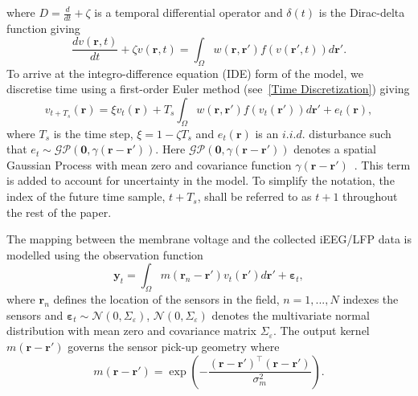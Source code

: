 \documentclass[10pt,a4paper]{article}
\begin{document}
where $D=\frac{d}{dt} + \zeta$ is a temporal differential operator and $\delta(t)$ is the Dirac-delta function giving 
\begin{equation}
	\label{FinalFormContinuous} 
	\frac{dv\left( \mathbf{r},t \right)}{dt} + \zeta v\left( \mathbf{r},t \right) = \int_\Omega {w\left( \mathbf{r},\mathbf{r}' \right)f\left( {v\left( \mathbf{r}',t \right)} \right)d\mathbf{r}'}. 
\end{equation}
To arrive at the integro-difference equation (IDE) form of the model, we discretise time using a first-order Euler method (see~\ref{Time Discretization}) giving 
\begin{equation}
	\label{DiscreteTimeModel} 
	v_{t+T_s}\left(\mathbf{r}\right) = 
	\xi v_t\left(\mathbf{r}\right) + 
	T_s \int_\Omega { 
	    w\left(\mathbf{r},\mathbf{r}'\right)
	    f\left(v_t\left(\mathbf{r}'\right)\right) 
	d\mathbf{r}'} 
	+ e_t\left(\mathbf{r}\right), 
\end{equation}
where $T_s$ is the time step, $\xi = 1-\zeta T_s$ and $e_t(\mathbf{r})$ is an $i.i.d.$ disturbance such that $e_t\sim\mathcal{GP}(\mathbf 0,\gamma(\mathbf{r}-\mathbf{r}'))$. Here $\mathcal{GP}(\mathbf 0,\gamma(\mathbf{r}-\mathbf{r}'))$ denotes a spatial Gaussian Process with mean zero and covariance function $\gamma(\mathbf{r}-\mathbf{r}')$~\cite{Rasmussen2005}. This term is added to account for uncertainty in the model. To simplify the notation, the index of the future time sample, $t+T_s$, shall be referred to as $t+1$ throughout the rest of the paper. 

The mapping between the membrane voltage and the collected iEEG/LFP data is modelled using the observation function 
\begin{equation}
    \label{eq:ObservationEquation}
	\mathbf{y}_t =
	\int_{\Omega}{
	    m\left(\mathbf{r}_n-\mathbf{r}'\right)v_t\left(\mathbf{r}'\right)
	d\mathbf{r}'} + 
	\boldsymbol{\varepsilon}_t, 
\end{equation}
where $\mathbf{r}_n$ defines the location of the sensors in the field, $n=1,...,N$ indexes the sensors and $\boldsymbol{\varepsilon}_t \sim \mathcal{N}\left(0,\Sigma_{\varepsilon}\right)$, $\mathcal{N}\left(0,\Sigma_{\varepsilon}\right)$ denotes the multivariate normal distribution with mean zero and covariance matrix $\Sigma_{\varepsilon}$. The output kernel $m(\mathbf{r}-\mathbf{r}')$ governs the sensor pick-up geometry where 
\begin{equation}
	m\left(\mathbf{r}-\mathbf{r}'\right) = \exp{\left(-\frac{(\mathbf{r}-\mathbf{r}')^\top(\mathbf{r}-\mathbf{r}')}{\sigma_m^2}\right)}. 
\end{equation}
\end{document}

